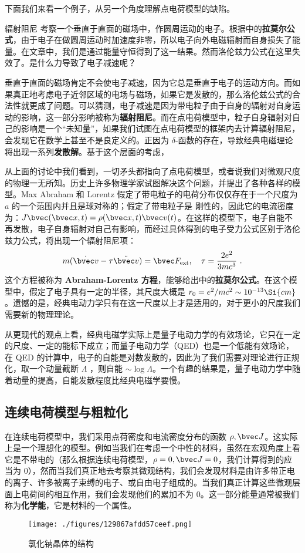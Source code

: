 下面我们来看一个例子，从另一个角度理解点电荷模型的缺陷。
\begin{example}{辐射阻尼}
考察一个垂直于直面的磁场中，作圆周运动的电子。根据中的\textbf{拉莫尔公式}，由于电子在做圆周运动时加速度非零，所以电子向外电磁辐射而自身损失了能量。在文章中，我们是通过能量守恒得到了这一结果。然而洛伦兹力公式在这里失效了。是什么力导致了电子减速呢？
\end{example}
垂直于直面的磁场肯定不会使电子减速，因为它总是垂直于电子的运动方向。而如果真正地考虑电子近邻区域的电场与磁场，如果它是发散的，那么洛伦兹公式的合法性就更成了问题。可以猜测，电子减速是因为带电粒子由于自身的辐射对自身运动的影响，这一部分影响被称为\textbf{辐射阻尼}。而在点电荷模型中，粒子自身辐射对自己的影响是一个“未知量”，如果我们试图在点电荷模型的框架内去计算辐射阻尼，会发现它在数学上甚至不是良定义的。正因为 $\delta$-函数的存在，导致经典电磁理论将出现一系列\textbf{发散解}。基于这个层面的考虑，

从上面的讨论中我们看到，一切矛头都指向了点电荷模型，或者说我们对微观尺度的物理一无所知。历史上许多物理学家试图解决这个问题，并提出了各种各样的模型。Max Abraham 和 Lorentz 假定了带电粒子的电荷分布仅仅存在于一个尺度为 $a$ 的一个范围内并且是球对称的；假定了带电粒子是
刚性的，因此它的电流密度为：$J\bvec (\bvec x, t) =\rho(\bvec x, t)\bvec v(t)$。在这样的模型下，电子自能不再发散，电子自身辐射对自己有影响，而经过具体得到的电子受力公式区别于洛伦兹力公式，将出现一个辐射阻尼项：
\begin{equation}
m(\dot{\bvec v}-\tau \ddot{\bvec v})=\bvec F_{\text{ext}},\quad \tau =\frac{2e^2}{3mc^3}~.
\end{equation}
这个方程被称为 \textbf{Abraham-Lorentz 方程}，能够给出中的\textbf{拉莫尔公式}。在这个模型中，假定了电子具有一定的半径，其尺度大概是 $r_0=e^2/mc^2\sim 10^{-13} \Si{cm}$。遗憾的是，经典电动力学只有在这一尺度以上才是适用的，对于更小的尺度我们需要新的物理理论。

从更现代的观点上看，经典电磁学实际上是量子电动力学的有效场论，它只在一定的尺度、一定的能标下成立；而量子电动力学（QED）也是一个低能有效场论，在 QED 的计算中，电子的自能是对数发散的，因此为了我们需要对理论进行正规化，取一个动量截断 $\Lambda$ ，则自能 $\sim \log \Lambda$。一个有趣的结果是，量子电动力学中随着动量的提高，自能发散程度比经典电磁学要慢。

\subsection{连续电荷模型与粗粒化}
在连续电荷模型中，我们采用点荷密度和电流密度分布的函数 $\rho,\bvec J$。这实际上是一个理想化的模型。例如当我们在考虑一个中性的材料，虽然在宏观角度上看它是不带电的（那么根据连续电荷模型，$\rho=0,\bvec J=0$，我们计算得到的应当为 $0$），然而当我们真正地去考察其微观结构，我们会发现材料是由许多带正电的离子、许多被离子束缚的电子、或自由电子组成的。当我们真正计算这些微观层面上电荷间的相互作用，我们会发现他们的累加不为 $0$。这一部分能量通常被我们称为\textbf{化学能}，它是材料的一个属性。
\begin{figure}[ht]
\centering
\texttt{[image: ./figures/129867afdd57ceef.png]}
\caption{氯化钠晶体的结构} \label{fig_elecdb_2}
\end{figure}


